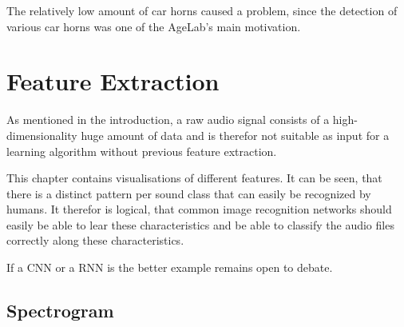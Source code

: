 The relatively low amount of car horns caused a problem, since the detection of various car horns was one of the AgeLab's main motivation.



\section{Feature Extraction}

As mentioned in the introduction, a raw audio signal consists of a high-dimensionality huge amount of data and is therefor not suitable as input for a learning algorithm without previous feature extraction.

This chapter contains visualisations of different features. It can be seen, that there is a distinct pattern per sound class that can easily be recognized by humans. It therefor is logical, that common image recognition networks should easily be able to lear these characteristics and be able to classify the audio files correctly along these characteristics.

If a CNN or a RNN is the better example remains open to debate.




\subsection{Spectrogram}

